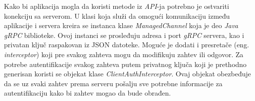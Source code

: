 \documentclass[android.tex]{subfiles}
\begin{document}
Kako bi aplikacija mogla da koristi metode iz \textit{API}-ja potrebno je ostvariti konekciju sa serverom. U klasi koja služi da omogući komunikaciju između aplikacije i servera kreira se instanca klase \textit{ManagedChannel} koja je deo \textit{Java gRPC} biblioteke. Ovoj instanci se prosleđuju adresa i port \textit{gRPC} servera, kao i privatan ključ raspakovan iz JSON datoteke. Moguće je dodati i presretače (eng. \textit{interceptor}) koji pre svakog zahteva mogu da modifikuju zahtev ili odgovor. Za potrebe autentifikacije svakog zahteva putem privatnog ključa koji je prethodno generisan koristi se objekat klase \textit{ClientAuthInterceptor}. Ovaj objekat obezbeđuje da se uz svaki zahtev prema serveru pošalju sve potrebne informacije za autentifikaciju kako bi zahtev mogao da bude obrađen. 
\end{document}
